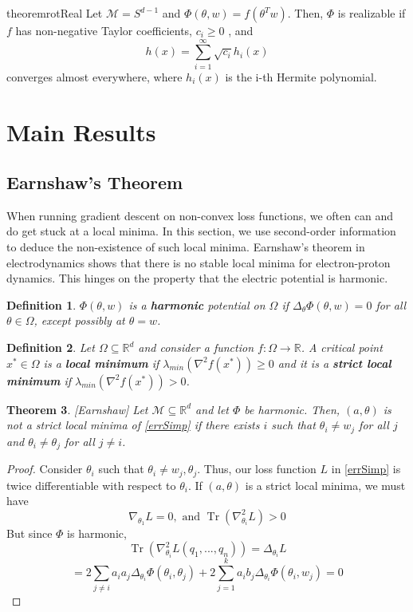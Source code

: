 \documentclass{article}
\newtheorem{theorem}{Theorem}[section]
\newtheorem{definition}[theorem]{Definition}
\newcommand{\R}{{\mathbb{R}}}
\DeclareMathOperator{\Tr}{Tr}
\begin{document}
\begin{restatable}{theorem}{rotReal}
\label{thm:rotReal}
Let $\mathcal{M} = S^{d-1}$ and $\Phi(\theta,w) = f(\theta^Tw)$. Then, $\Phi$ is realizable if $f$ has non-negative Taylor coefficients, $c_i \geq 0$ , and 
\[h(x) = \sum_{i=1}^\infty \sqrt{c_i} h_i(x)\]
converges almost everywhere, where $h_i(x)$ is the i-th Hermite polynomial.
\end{restatable}

\section{Main Results} 

\subsection{Earnshaw's Theorem}

When running gradient descent on non-convex loss functions, we often can and do get stuck at a local minima. In this section, we use second-order information to deduce the non-existence of such local minima. Earnshaw's theorem in electrodynamics shows that there is no stable local minima for electron-proton dynamics. This hinges on the property that the electric potential is harmonic. 

\begin{definition}
$\Phi(\theta,w)$ is a {\bf harmonic} potential on $\Omega$ if $\Delta_\theta \Phi(\theta,w) = 0$ for all $\theta \in \Omega$, except possibly at $\theta = w$.
\end{definition}

\begin{definition}
Let $\Omega \subseteq \R^d$ and consider a function $f:\Omega \to \R$. A critical point $x^* \in \Omega$ is a {\bf local minimum} if $\lambda_{min}(\nabla^2 f(x^*)) \geq 0$ and it is a {\bf strict local minimum}  if  $\lambda_{min}(\nabla^2 f(x^*)) > 0$.
\end{definition}

\begin{theorem}\label{Earnshaw} \cite{arnold1985mathematical}[Earnshaw]
Let $\mathcal{M}\subseteq \R^d$ and let $\Phi$ be harmonic. Then, $(a,\theta)$ is not a strict local minima of \eqref{errSimp} if there exists $i$ such that $\theta_i \neq w_j$ for all $j$ and $\theta_i \neq \theta_j$ for all $j\neq i$.
\end{theorem}

\begin{proof}
Consider $\theta_i$ such that $\theta_i \neq w_j, \theta_j$. Thus, our loss function $L$ in \eqref{errSimp} is twice differentiable with respect to $\theta_i$. If $(a,\theta)$ is a strict local minima, we must have
\[\nabla_{\theta_1} L = 0, \text{ and }  \Tr(\nabla^2_{\theta_i}L) > 0\]
But since $\Phi$ is harmonic,
\[ \Tr(\nabla^2_{\theta_i}L(q_1,...,q_n)) = \Delta_{\theta_i} L\]
\[ =  2\sum_{ j\neq i} a_ia_j \Delta_{\theta_i}\Phi(\theta_i,\theta_j) + 2\sum_{j=1}^ka_ib_j  \Delta_{\theta_i}\Phi(\theta_i,w_j) = 0\]
\end{proof}
\end{document}
